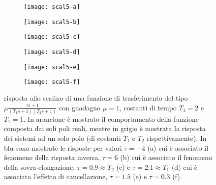 			\begin{figure}[p]
				\centering
				\begin{subfigure}{0.48\linewidth}
					\centering
					\texttt{[image: scal5-a]} \caption{}
				\end{subfigure}
				\begin{subfigure}{0.48\linewidth}
					\centering
					\texttt{[image: scal5-b]} \caption{}
				\end{subfigure}
				\begin{subfigure}{0.48\linewidth}
					\centering
					\texttt{[image: scal5-c]} \caption{}
				\end{subfigure}
				\begin{subfigure}{0.48\linewidth}
					\centering
					\texttt{[image: scal5-d]} \caption{}
				\end{subfigure}
				\begin{subfigure}{0.48\linewidth}
					\centering
					\texttt{[image: scal5-e]} \caption{}
				\end{subfigure}
				\begin{subfigure}{0.48\linewidth}
					\centering
					\texttt{[image: scal5-f]} \caption{}
				\end{subfigure}
			
				\caption{risposta allo scalino di una funzione di trasferimento del tipo $\mu \frac{\tau s + 1}{(T_1s+1)(T_2s+1)}$ con guadagno $\mu = 1$, costanti di tempo $T_1 = 2$ e $T_1 = 1$. In arancione è mostrato il comportamento della funzione composta dai soli poli reali, mentre in grigio è mostrata la risposta dei sistemi ad un solo polo (di costanti $T_1$ e $T_2$ rispettivamente). In blu sono mostrate le risposte per valori $\tau = -4$ (a) cui è associato il fenomeno della risposta inversa, $\tau = 6$ (b) cui è associato il fenomeno della sovra-elongazione, $\tau = 0.9 \approx T_2$ (c) e  $\tau = 2.1 \approx T_1$ (d) cui è associato l'effetto di cancellazione, $\tau=1.5$ (e) e $\tau =0.3$ (f).}
				\label{fig:lti:sist2zero}
			\end{figure}
		
